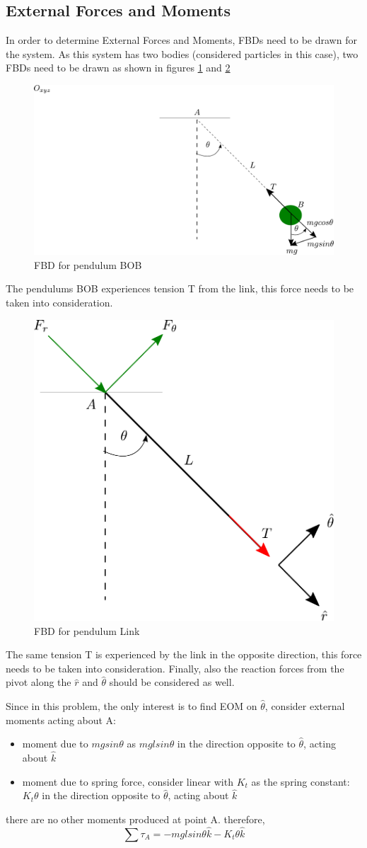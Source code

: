 \subsection{External Forces and Moments}

In order to determine External Forces and Moments, FBDs need to be drawn for the system. As this system has two bodies (considered particles in this case), two FBDs need to be drawn as shown in figures \ref{fig_0_ch_4_PendulumProblem_FBD_BOB} and \ref{fig_0_ch_4_PendulumProblem_FBD_Link}
\newpage
\begin{figure}[h!]
	\centering
	\includegraphics[width=0.4\linewidth]{Bilder/17_PendulumExercise_FBD_Bob.pdf}
	\caption{FBD for pendulum BOB}
	\label{fig_0_ch_4_PendulumProblem_FBD_BOB}
\end{figure}
The pendulums BOB experiences tension T from the link, this force needs to be taken into consideration.

\begin{figure}[h!]
	\centering
	\includegraphics[width=0.4\linewidth]{Bilder/17_PendulumExercise_FBD_Rod.pdf}
	\caption{FBD for pendulum Link}
	\label{fig_0_ch_4_PendulumProblem_FBD_Link}
\end{figure}

The same tension T is experienced by the link in the opposite direction, this force needs to be taken into consideration. Finally, also the reaction forces from the pivot along the $\hat{r}$ and $\hat{\theta}$ should be considered as well. 

Since in this problem, the only interest is to find EOM on $\hat{\theta}$, consider external moments acting about A:
\begin{itemize}
	\item moment due to $mgsin\theta$ as $mglsin\theta$ in the direction opposite to $\hat{\theta}$, acting about $\hat{k}$
	\item moment due to spring force, consider linear with $K_{t}$ as the spring constant: $K_{t}\theta$ in the direction opposite to $\hat{\theta}$, acting about $\hat{k}$
\end{itemize}
there are no other moments produced at point A.
therefore,
\begin{equation}
	\sum \tau_{A} = -mglsin\theta \hat{k} - K_{t}\theta \hat{k}
\end{equation}

